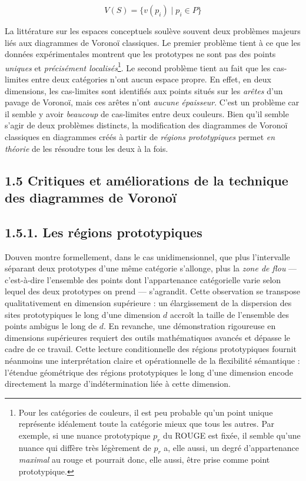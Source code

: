 \documentclass{article}
\begin{document}
\[
V(S) = \{v(p_i) \mid p_i \in P\}
\]

La littérature sur les espaces conceptuels soulève souvent deux problèmes majeurs liés aux diagrammes de Voronoï classiques. Le premier problème tient à ce que les données expérimentales montrent que les prototypes ne sont pas des points \textit{ uniques} et \textit{précisément localisés}\footnote{Pour les catégories de couleurs, il est peu probable qu’un point unique représente idéalement toute la catégorie mieux que tous les autres. Par exemple, si une nuance prototypique $p_r$ du ROUGE est fixée, il semble qu'une nuance qui diffère très légèrement de $p_r$ a, elle aussi, un degré d'appartenance \textit{maximal} au rouge et pourrait donc, elle aussi, être prise comme point prototypique.}. Le second problème tient au fait que les cas-limites entre deux catégories n'ont aucun espace propre. En effet, en deux dimensions, les cas-limites sont identifiés aux points situés sur les \textit{arêtes} d'un pavage de Voronoï, mais ces arêtes n'ont \textit{aucune épaisseur}. C'est un problème car il semble y avoir \textit{beaucoup} de cas-limites entre deux couleurs. Bien qu'il semble s'agir de deux problèmes distincts, la modification des diagrammes de Voronoï classiques en diagrammes créés à partir de \textit{régions prototypiques} permet \textit{en théorie} de les résoudre tous les deux à la fois.

\subsection*{1.5 Critiques et améliorations de la technique des diagrammes de Voronoï}
\subsection*{1.5.1. Les régions prototypiques}

\par
Douven montre formellement, dans le cas unidimensionnel, que plus l'intervalle séparant deux prototypes d'une même catégorie s'allonge, plus la \emph{zone de flou} — c'est-à-dire l'ensemble des points dont l'appartenance catégorielle varie selon lequel des deux prototypes on prend — s'agrandit. Cette observation se transpose qualitativement en dimension supérieure : un élargissement de la dispersion des sites prototypiques le long d'une dimension $d$ accroît la taille de l'ensemble des points ambigus le long de $d$. En revanche, une démonstration rigoureuse en dimensions supérieures requiert des outils mathématiques avancés et dépasse le cadre de ce travail. Cette lecture conditionnelle des régions prototypiques fournit néanmoins une interprétation claire et opérationnelle de la flexibilité sémantique : l'étendue géométrique des régions prototypiques le long d'une dimension encode directement la marge d'indétermination liée à cette dimension.
\end{document}
